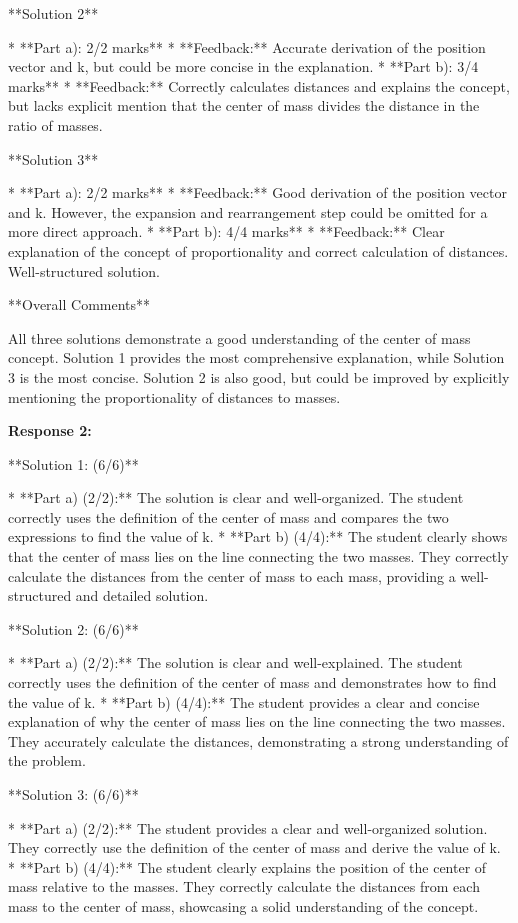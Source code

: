 \documentclass[a4paper,11pt]{article}
\begin{document}
**Solution 2**

* **Part a): 2/2 marks**
   * **Feedback:**  Accurate derivation of the position vector and k, but could be more concise in the explanation.
* **Part b): 3/4 marks**
   * **Feedback:** Correctly calculates distances and explains the concept, but lacks explicit mention that the center of mass divides the distance in the ratio of masses.

**Solution 3**

* **Part a): 2/2 marks**
   * **Feedback:**  Good derivation of the position vector and k. However, the expansion and rearrangement step could be omitted for a more direct approach.
* **Part b): 4/4 marks**
   * **Feedback:** Clear explanation of the concept of proportionality and correct calculation of distances. Well-structured solution.

**Overall Comments**

All three solutions demonstrate a good understanding of the center of mass concept. Solution 1 provides the most comprehensive explanation, while Solution 3 is the most concise. Solution 2 is also good, but could be improved by explicitly mentioning the proportionality of distances to masses.

\bigskip    
\textbf{Response 2:}

**Solution 1: (6/6)**

*   **Part a) (2/2):** The solution is clear and well-organized. The student correctly uses the definition of the center of mass and compares the two expressions to find the value of k.
*   **Part b) (4/4):** The student clearly shows that the center of mass lies on the line connecting the two masses. They correctly calculate the distances from the center of mass to each mass, providing a well-structured and detailed solution.

**Solution 2: (6/6)**

*   **Part a) (2/2):** The solution is clear and well-explained. The student correctly uses the definition of the center of mass and demonstrates how to find the value of k.
*   **Part b) (4/4):** The student provides a clear and concise explanation of why the center of mass lies on the line connecting the two masses. They accurately calculate the distances, demonstrating a strong understanding of the problem.

**Solution 3: (6/6)**

*   **Part a) (2/2):** The student provides a clear and well-organized solution. They correctly use the definition of the center of mass and derive the value of k.
*   **Part b) (4/4):** The student clearly explains the position of the center of mass relative to the masses. They correctly calculate the distances from each mass to the center of mass, showcasing a solid understanding of the concept.
\end{document}
